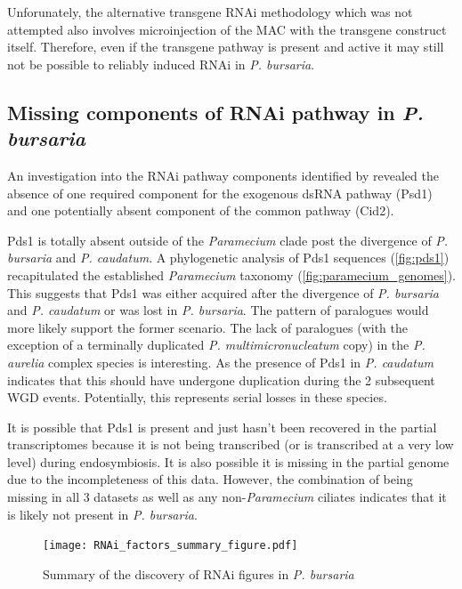 Unforunately, the alternative transgene RNAi methodology \citep{Galvani2001} 
which was not attempted also involves microinjection of the MAC with
the transgene construct itself.  Therefore, even if the transgene
pathway is present and active it may still not be possible to reliably
induced RNAi in \textit{P. bursaria}.

\subsection{Missing components of RNAi pathway in \textit{P. bursaria}}

An investigation into the RNAi pathway components identified by \citep{Marker2014}
revealed the absence of one required component for the exogenous dsRNA
pathway (Psd1) and one potentially absent component of the common pathway (Cid2).


Pds1 is totally absent outside of the \textit{Paramecium} clade post the divergence
of \textit{P. bursaria} and \textit{P. caudatum}.  A phylogenetic
analysis of Pds1 sequences (\cref{fig:pds1}) recapitulated the established 
\textit{Paramecium} taxonomy (\cref{fig:paramecium_genomes}).
This suggests that Pds1 was either acquired after the divergence of \textit{P. bursaria}
and \textit{P. caudatum} or was lost in \textit{P. bursaria}.
The pattern of paralogues would more likely support the former scenario.
The lack of paralogues (with the exception of a terminally duplicated \textit{P. multimicronucleatum}
copy) in the \textit{P. aurelia} complex species is interesting.  As the presence
of Pds1 in \textit{P. caudatum} indicates that this should have undergone
duplication during the 2 subsequent WGD events.  Potentially, this represents
serial losses in these species.

It is possible that Pds1 is present and just hasn't been recovered 
in the partial transcriptomes because it is not being transcribed (or is 
transcribed at a very low level) during endosymbiosis.  It is also
possible it is missing in the partial genome due to the incompleteness
of this data.  However, the combination of being missing in all 3 datasets
as well as any non-\textit{Paramecium} ciliates indicates that
it is likely not present in \textit{P. bursaria}.

\begin{figure}
    \texttt{[image: RNAi\_factors\_summary\_figure.pdf]}
    \caption[Summary of RNAi Factors Presence]{Summary of the discovery
    of RNAi figures in \textit{P. bursaria}}
    \label{fig:rnai_summary}
\end{figure}

